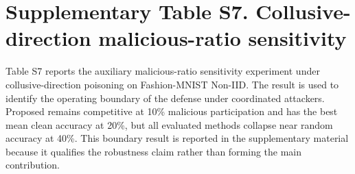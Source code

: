 \documentclass[12pt]{article}
\begin{document}
\begin{table}[h]
\centering
\caption*{S6. Estimated finality latency under representative network settings.}
\end{table}

\clearpage
\section*{Supplementary Table S7. Collusive-direction malicious-ratio sensitivity}

Table S7 reports the auxiliary malicious-ratio sensitivity experiment under collusive-direction poisoning on Fashion-MNIST Non-IID. The result is used to identify the operating boundary of the defense under coordinated attackers. Proposed remains competitive at 10\% malicious participation and has the best mean clean accuracy at 20\%, but all evaluated methods collapse near random accuracy at 40\%. This boundary result is reported in the supplementary material because it qualifies the robustness claim rather than forming the main contribution.
\end{document}

